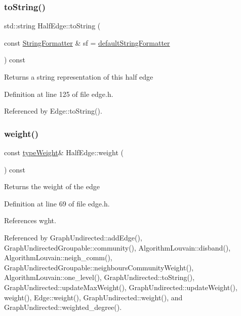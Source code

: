 \subsubsection{\texorpdfstring{to\+String()}{toString()}}
{\footnotesize\ttfamily std\+::string Half\+Edge\+::to\+String (\begin{DoxyParamCaption}\item[{const \hyperlink{classStringFormatter}{String\+Formatter} \&}]{sf = {\ttfamily \hyperlink{stringFormatter_8h_abf1349c8e24162d0134072aff288f2a2}{default\+String\+Formatter}} }\end{DoxyParamCaption}) const\hspace{0.3cm}{\ttfamily [inline]}}

\begin{DoxyReturn}{Returns}
a string representation of this half edge 
\end{DoxyReturn}


Definition at line 125 of file edge.\+h.



Referenced by Edge\+::to\+String().

\mbox{\label{classHalfEdge_a89cc13d21ae44a9d9c2ba95f89576090}} 
\subsubsection{\texorpdfstring{weight()}{weight()}\hspace{0.1cm}{\footnotesize\ttfamily [1/2]}}
{\footnotesize\ttfamily const \hyperlink{edge_8h_a2e7ea3be891ac8b52f749ec73fee6dd2}{type\+Weight}\& Half\+Edge\+::weight (\begin{DoxyParamCaption}{ }\end{DoxyParamCaption}) const\hspace{0.3cm}{\ttfamily [inline]}}

\begin{DoxyReturn}{Returns}
the weight of the edge 
\end{DoxyReturn}


Definition at line 69 of file edge.\+h.



References wght.



Referenced by Graph\+Undirected\+::add\+Edge(), Graph\+Undirected\+Groupable\+::community(), Algorithm\+Louvain\+::disband(), Algorithm\+Louvain\+::neigh\+\_\+comm(), Graph\+Undirected\+Groupable\+::neighbours\+Community\+Weight(), Algorithm\+Louvain\+::one\+\_\+level(), Graph\+Undirected\+::to\+String(), Graph\+Undirected\+::update\+Max\+Weight(), Graph\+Undirected\+::update\+Weight(), weight(), Edge\+::weight(), Graph\+Undirected\+::weight(), and Graph\+Undirected\+::weighted\+\_\+degree().

